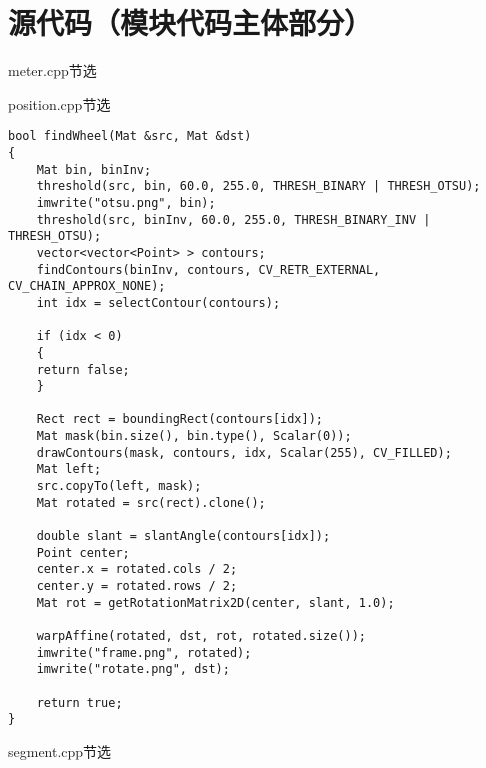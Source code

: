 
\chapter{源代码（模块代码主体部分）}
\lstset{
  tabsize=4,
  frame=none,
  stringstyle=\ttfamily,
  numbers=left,
  numberstyle=\small,
  extendedchars=false,columns=flexible,mathescape=true
  numbersep=-1em
}

meter.cpp节选

position.cpp节选
\begin{lstlisting}
bool findWheel(Mat &src, Mat &dst)
{
    Mat bin, binInv;
    threshold(src, bin, 60.0, 255.0, THRESH_BINARY | THRESH_OTSU);
    imwrite("otsu.png", bin);
    threshold(src, binInv, 60.0, 255.0, THRESH_BINARY_INV | THRESH_OTSU);
    vector<vector<Point> > contours;
    findContours(binInv, contours, CV_RETR_EXTERNAL, CV_CHAIN_APPROX_NONE);
    int idx = selectContour(contours);

    if (idx < 0)
    {
	return false;
    }

    Rect rect = boundingRect(contours[idx]);
    Mat mask(bin.size(), bin.type(), Scalar(0));
    drawContours(mask, contours, idx, Scalar(255), CV_FILLED);
    Mat left;
    src.copyTo(left, mask);
    Mat rotated = src(rect).clone();

    double slant = slantAngle(contours[idx]);
    Point center;
    center.x = rotated.cols / 2;
    center.y = rotated.rows / 2;
    Mat rot = getRotationMatrix2D(center, slant, 1.0);

    warpAffine(rotated, dst, rot, rotated.size());    
    imwrite("frame.png", rotated);
    imwrite("rotate.png", dst);

    return true;
}
\end{lstlisting}
segment.cpp节选
